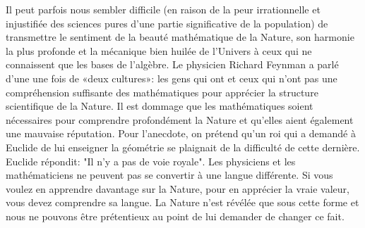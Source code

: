 	Il peut parfois nous sembler difficile (en raison de la peur irrationnelle et injustifiée des sciences pures d'une partie significative de la population) de transmettre le sentiment de la beauté mathématique de la Nature, son harmonie la plus profonde et la mécanique bien huilée de l'Univers à ceux qui ne connaissent que les bases de l'algèbre. Le physicien Richard Feynman a parlé d'une une fois de «deux cultures»: les gens qui ont et ceux qui n'ont pas une compréhension suffisante des mathématiques pour apprécier la structure scientifique de la Nature. Il est dommage que les mathématiques soient nécessaires pour comprendre profondément la Nature et qu'elles aient également une mauvaise réputation. Pour l'anecdote, on prétend qu'un roi qui a demandé à Euclide de lui enseigner la géométrie se plaignait de la difficulté de cette dernière. Euclide répondit: "Il n'y a pas de voie royale". Les physiciens et les mathématiciens ne peuvent pas se convertir à une langue différente. Si vous voulez en apprendre davantage sur la Nature, pour en apprécier la vraie valeur, vous devez comprendre sa langue. La Nature n'est révélée que sous cette forme et nous ne pouvons être prétentieux au point de lui demander de changer ce fait.
	
